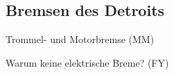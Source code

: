 \subsection{Bremsen des Detroits}
Trommel- und Motorbremse (MM)

Warum keine elektrische Breme? (FY)